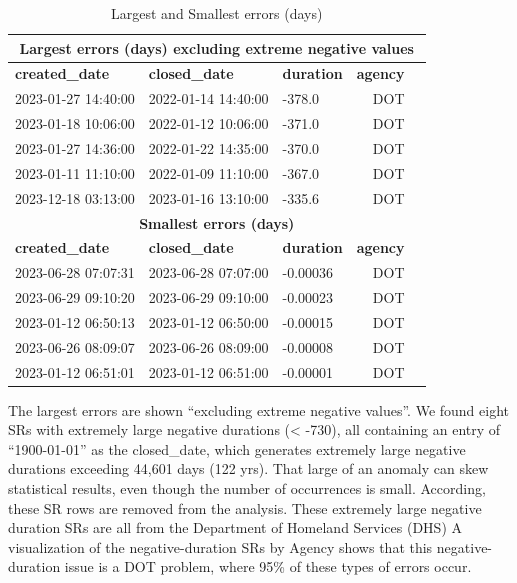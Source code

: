 \documentclass[12pt, titlepage]{article}
\begin{document}
\begin{table}[tbp]
    \centering
    \caption{Largest and Smallest errors (days)}
	    \begin{tabular}{l l l r l}
	        \toprule
	        \multicolumn{5}{c}{\textbf{Largest errors (days) excluding 
	        extreme negative values}} \\
	        \midrule
	        \textbf{created\_date} & \textbf{closed\_date} & \textbf{duration} 
	        & \textbf{agency} \\
		        \midrule
		        2023-01-27 14:40:00 & 2022-01-14 14:40:00 & -378.0 & DOT \\
		        2023-01-18 10:06:00 & 2022-01-12 10:06:00 & -371.0 & DOT \\
		        2023-01-27 14:36:00 & 2022-01-22 14:35:00 & -370.0 & DOT \\
		        2023-01-11 11:10:00 & 2022-01-09 11:10:00 & -367.0 & DOT \\
		        2023-12-18 03:13:00 & 2023-01-16 13:10:00 & -335.6 & DOT \\
		        \midrule
		        \multicolumn{5}{c}{\textbf{Smallest errors (days)}} \\
		        \midrule
		        \textbf{created\_date} & \textbf{closed\_date} & \textbf{duration} 
		        & \textbf{agency} \\
		        \midrule
		        2023-06-28 07:07:31 & 2023-06-28 07:07:00 & -0.00036 & DOT \\
		        2023-06-29 09:10:20 & 2023-06-29 09:10:00 & -0.00023 & DOT \\
		        2023-01-12 06:50:13 & 2023-01-12 06:50:00 & -0.00015 & DOT \\
		        2023-06-26 08:09:07 & 2023-06-26 08:09:00 & -0.00008 & DOT \\
		        2023-01-12 06:51:01 & 2023-01-12 06:51:00 & -0.00001 & DOT \\
		        \bottomrule
	    \end{tabular}
    \label{tab:combined_errors}
\end{table}
	
The largest errors are shown ``excluding extreme negative values''. We found 
eight SRs with extremely large negative durations (\textless{} -730), all containing 
an entry of ``1900-01-01'' as the closed\_date, which generates extremely large 
negative durations exceeding 44,601 days (122 yrs). That large of an anomaly 
can skew statistical results, even though the number of occurrences is 
small. According, these  SR rows are removed from the analysis. These 
extremely large negative duration SRs are all from the 
Department of Homeland Services (DHS) A visualization of the 
negative-duration SRs by Agency shows that this negative-duration 
issue is a DOT problem, where 95\% of these types of errors occur. 
	
\end{document}
